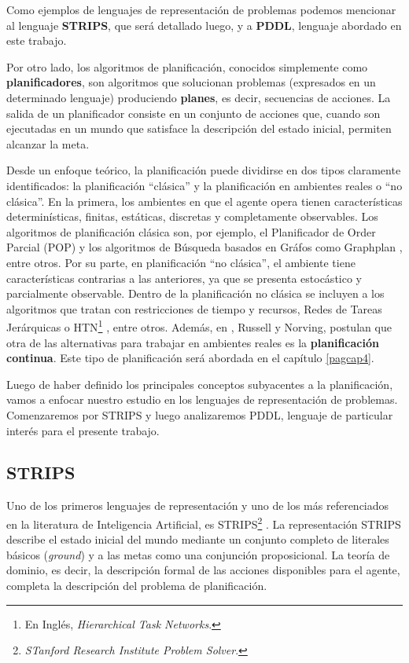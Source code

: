 Como ejemplos de lenguajes de representaci\'on de problemas podemos mencionar al
lenguaje {\bf STRIPS}, que ser\'a detallado luego, y a {\bf PDDL}, lenguaje
abordado en este trabajo.

Por otro lado, los algoritmos de planificaci\'on, conocidos simplemente 
como {\bf planificadores}, son algoritmos que solucionan problemas 
(expresados en un determinado lenguaje) produciendo {\bf planes}, 
es decir, secuencias de acciones. La salida de un planificador consiste 
en un conjunto de acciones que, cuando son ejecutadas en un
mundo que satisface la descripci\'on del estado inicial, permiten alcanzar la meta. 

Desde un enfoque te\'orico, la planificaci\'on puede dividirse en dos tipos claramente
identificados: la planificaci\'on ``cl\'asica'' y la planificaci\'on en 
ambientes reales o ``no cl\'asica''. En la primera, los ambientes en que
el agente opera tienen caracter\'isticas determin\'isticas,
finitas, est\'aticas, dis\-cre\-tas y completamente
observables. Los algoritmos de planificaci\'on cl\'asica son, por ejemplo,
el Planificador de Order Parcial (POP) \cite{gbraun:pop:1991} y los algoritmos
de B\'usqueda basados en Gr\'afos como Graphplan \cite{gbraun:graphplan}, entre
otros. Por su parte, en planificaci\'on ``no cl\'asica'', el ambiente tiene
caracter\'isticas contrarias a las anteriores, ya que se presenta estoc\'astico
y parcialmente observable. Dentro de la planificaci\'on no
cl\'asica se incluyen a los algoritmos que tratan con restricciones
de tiempo y recursos, Redes de Tareas Jer\'arquicas o 
HTN\footnote{En Ingl\'es, \emph{Hierarchical Task
Networks}.} \cite{gbaun:Erol:1996:HTN:238496}, entre otros.
Adem\'as, en \cite{gbraun:Rus09}, Russell y Norving, postulan
que otra de las alternativas para trabajar en ambientes reales
es la {\bf planificaci\'on continua}. Este tipo de planificaci\'on ser\'a
abordada en el cap\'itulo \ref{pagcap4}.

Luego de haber definido los principales conceptos subyacentes a
la planificaci\'on, vamos a enfocar nuestro estudio en los lenguajes
de representaci\'on de problemas. Comenzaremos por STRIPS y luego
analizaremos PDDL, lenguaje de particular inter\'es para el presente trabajo.

\subsection{STRIPS} \label{cap1: STRIPS}

Uno de los primeros lenguajes de representaci\'on y uno de los m\'as referenciados en la
literatura de Inteligencia Artificial, es STRIPS\footnote{\emph{STanford Research Institute 
Problem Solver}.} \cite{fn:str}. 
La representaci\'on STRIPS describe el estado inicial del mundo mediante 
un conjunto completo de literales b\'asicos (\emph{ground}) y 
a las metas como una conjunci\'on proposicional. 
La teor\'ia de dominio, es decir, la descripci\'on formal de las acciones disponibles para el agente, 
completa la descripci\'on del problema de planificaci\'on.

